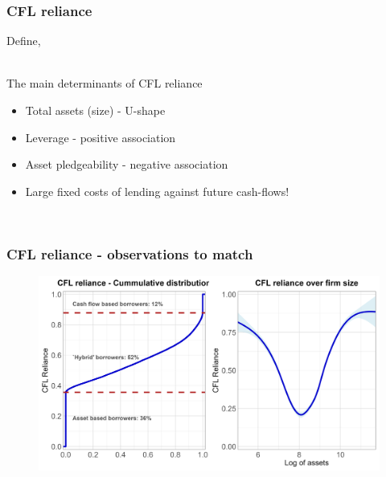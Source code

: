 \documentclass[notes]{beamer}
\begin{document}
\begin{frame}[label = nameit] \frametitle{CFL reliance}
Define, \\
\begin{center}
\end{center}
\vspace{3mm} \\
The main determinants of CFL reliance
 \begin{itemize}
     \setlength\itemsep{0em}
        \item Total assets (size) - U-shape
        \item Leverage - positive association
        \item Asset pledgeability - negative association
        \item Large fixed costs of lending against future cash-flows!
 \end{itemize} \vspace{3mm} \\

\begin{center}
\hyperlink{multi}{}
\hspace{2cm}
\hyperlink{fc}{}
\end{center}

 
\end{frame}


\begin{frame}[label=slide3] \frametitle{CFL reliance - observations to match}
\begin{figure}[H]  %
    \centering
    \includegraphics[width=1\textwidth]{smoothcfd.png}
\end{figure}
\begin{center}
\hyperlink{U_sector}{}
\hspace{2cm}
\hyperlink{U_country}{}
\end{center}
\end{frame}
\end{document}

